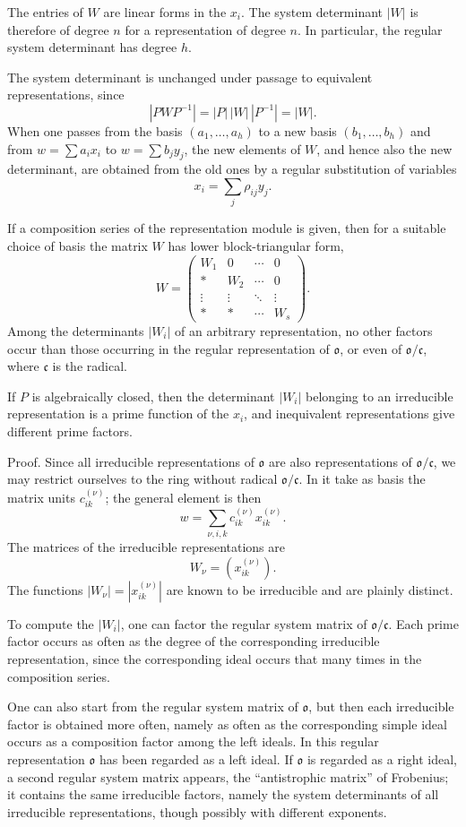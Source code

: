 \documentclass[11pt]{article}
\providecommand{\mo}{\mathfrak{o}}
\providecommand{\mc}{\mathfrak{c}}
\begin{document}
The entries of $W$ are linear forms in the $x_i$. The system determinant $|W|$ is therefore of degree $n$ for a representation of degree $n$. In particular, the regular system determinant has degree $h$.

The system determinant is unchanged under passage to equivalent representations, since
\[
        |PWP^{-1}|=|P|\,|W|\,|P^{-1}|=|W|.
\]
When one passes from the basis $(a_1,\ldots,a_h)$ to a new basis $(b_1,\ldots,b_h)$ and from $w=\sum a_ix_i$ to $w=\sum b_jy_j$, the new elements of $W$, and hence also the new determinant, are obtained from the old ones by a regular substitution of variables
\[
        x_i=\sum_j \rho_{ij}y_j.
\]

If a composition series of the representation module is given, then for a suitable choice of basis the matrix $W$ has lower block-triangular form,
\[
        W=\begin{pmatrix}
        W_1&0&\cdots&0\\
        *&W_2&\cdots&0\\
        \vdots&\vdots&\ddots&\vdots\\
        *&*&\cdots&W_s
        \end{pmatrix}.
\]
Among the determinants $|W_i|$ of an arbitrary representation, no other factors occur than those occurring in the regular representation of $\mo$, or even of $\mo/\mc$, where $\mc$ is the radical.

If $P$ is algebraically closed, then the determinant $|W_i|$ belonging to an irreducible representation is a prime function of the $x_i$, and inequivalent representations give different prime factors.

Proof. Since all irreducible representations of $\mo$ are also representations of $\mo/\mc$, we may restrict ourselves to the ring without radical $\mo/\mc$. In it take as basis the matrix units $c_{ik}^{(\nu)}$; the general element is then
\[
        w=\sum_{\nu,i,k} c_{ik}^{(\nu)}x_{ik}^{(\nu)}.
\]
The matrices of the irreducible representations are
\[
        W_\nu=(x_{ik}^{(\nu)}).
\]
The functions $|W_\nu|=|x_{ik}^{(\nu)}|$ are known to be irreducible and are plainly distinct.

To compute the $|W_i|$, one can factor the regular system matrix of $\mo/\mc$. Each prime factor occurs as often as the degree of the corresponding irreducible representation, since the corresponding ideal occurs that many times in the composition series.

One can also start from the regular system matrix of $\mo$, but then each irreducible factor is obtained more often, namely as often as the corresponding simple ideal occurs as a composition factor among the left ideals. In this regular representation $\mo$ has been regarded as a left ideal. If $\mo$ is regarded as a right ideal, a second regular system matrix appears, the ``antistrophic matrix'' of Frobenius; it contains the same irreducible factors, namely the system determinants of all irreducible representations, though possibly with different exponents.
\end{document}
